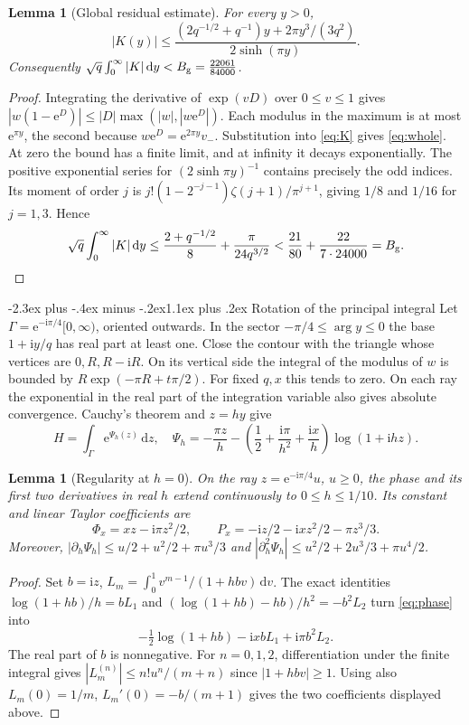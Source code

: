 \documentclass[11pt,a4paper]{article}
\makeatletter
\newtheorem{lemma}[theorem]{Lemma}
\newcommand{\dd}{\,\mathrm d}
\newcommand{\ii}{\mathrm i}
\newcommand{\e}{\mathrm e}
\renewcommand\section{\@startsection{section}{1}{\z@}
  {-2.3ex plus -.4ex minus -.2ex}{1.1ex plus .2ex}
  {\normalfont\large\bfseries\centering}}
\makeatother
\begin{document}
\begin{lemma}[Global residual estimate]\label{lem:global}
For every $y>0$,
\begin{equation}\label{eq:whole}
 |K(y)|\le
 \frac{(2q^{-1/2}+q^{-1})y+2\pi y^3/(3q^2)}
 {2\sinh(\pi y)} .
\end{equation}
Consequently $\sqrt q\int_0^\infty |K|\dd y < B_{\rm g}=\frac{22061}{84000}$.
\end{lemma}
\begin{proof}
Integrating the derivative of $\exp(vD)$ over $0\le v\le1$ gives $|w(1-\e^D)|\le |D|\max(|w|,|w\e^D|)$. Each modulus in the maximum is at most $\e^{\pi y}$, the second because
$w\e^D=\e^{2\pi y}v_-$. Substitution into \eqref{eq:K} gives
\eqref{eq:whole}. At zero the bound has a finite limit, and at infinity
it decays exponentially. The positive exponential series for
$(2\sinh\pi y)^{-1}$ contains precisely the odd indices. Its moment
of order $j$ is $j!(1-2^{-j-1})\zeta(j+1)/\pi^{j+1}$, giving
$1/8$ and $1/16$ for $j=1,3$. Hence
\[
 \sqrt q\int_0^\infty |K|\dd y
 \le \frac{2+q^{-1/2}}8+\frac{\pi}{24q^{3/2}}
 <\frac{21}{80}+\frac{22}{7\cdot24000}=B_{\rm g}.
\]
\end{proof}

\section{Rotation of the principal integral}
Let $\Gamma=\e^{-\ii\pi/4}[0,\infty)$, oriented outwards. In the sector
$-\pi/4\le\arg y\le0$ the base $1+\ii y/q$ has real part at least one.
Close the contour with the triangle whose vertices are $0,R,R-\ii R$.
On its vertical side the integral of the modulus of $w$ is bounded by $R\exp(-\pi R+t\pi/2)$.
For fixed $q,x$ this tends to zero. On each ray the exponential in the real
part of the integration variable also gives absolute convergence. Cauchy's theorem and $z=hy$ give
\begin{equation}\label{eq:phase}
 H=\int_\Gamma \e^{\Psi_h(z)}\dd z,\quad
 \Psi_h=-\frac{\pi z}{h}
 -\left(\frac12+\frac{\ii\pi}{h^2}+\frac{\ii x}{h}\right)\log(1+\ii hz).
\end{equation}

\begin{lemma}[Regularity at $h=0$]\label{lem:tay}
On the ray $z=\e^{-\ii\pi/4}u$, $u\ge0$, the phase and its first two derivatives in real $h$ extend continuously
to $0\le h\le1/10$. Its constant and linear Taylor coefficients are
\[
 \Phi_x=xz-\ii\pi z^2/2,\qquad
 P_x=-\ii z/2-\ii xz^2/2-\pi z^3/3 .
\]
Moreover, $|\partial_h\Psi_h|\le u/2+u^2/2+\pi u^3/3$ and
$|\partial_h^2\Psi_h|\le u^2/2+2u^3/3+\pi u^4/2$.
\end{lemma}
\begin{proof}
Set $b=\ii z$, $L_m=\int_0^1 v^{m-1}/(1+hbv)\dd v$.
The exact identities $\log(1+hb)/h=bL_1$ and
$(\log(1+hb)-hb)/h^2=-b^2L_2$ turn \eqref{eq:phase} into
\[
 -\tfrac12\log(1+hb)-\ii xbL_1+\ii\pi b^2L_2 .
\]
The real part of $b$ is nonnegative.
For $n=0,1,2$, differentiation under the finite integral gives
$|L_m^{(n)}|\le n!u^n/(m+n)$ since $|1+hbv|\ge1$. Using also
$L_m(0)=1/m$, $L_m'(0)=-b/(m+1)$ gives the two coefficients displayed above.
\end{proof}
\end{document}

